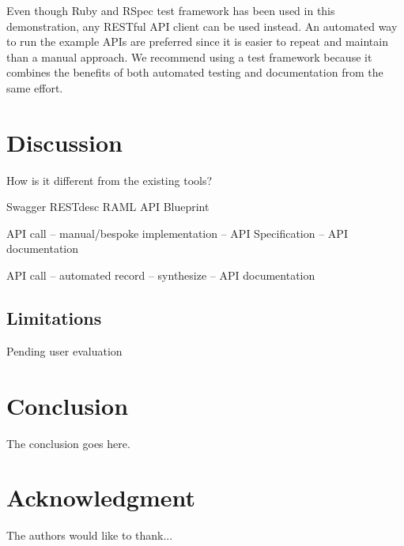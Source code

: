 \documentclass[conference]{IEEEtran}
\begin{document}
Even though Ruby and RSpec test framework has been used in this demonstration, any RESTful API client can be used instead. An automated way to run the example APIs are preferred since it is easier to repeat and maintain than a manual approach. We recommend using a test framework because it combines the benefits of both automated testing and documentation from the same effort.

\section{Discussion}
How is it different from the existing tools?

Swagger
RESTdesc
RAML
API Blueprint


API call -- manual/bespoke implementation -- API Specification -- API documentation

API call -- automated record -- synthesize --  API documentation


\subsection{Limitations}
Pending user evaluation
\section{Conclusion}
The conclusion goes here.

\section*{Acknowledgment}


The authors would like to thank...







\end{document}
